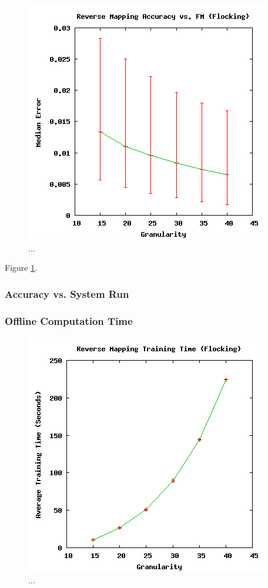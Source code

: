 \begin{figure}[ht]
\centering
\includegraphics[scale=.5]{images/results_flocking/rmacc.png}
\caption{...}
\label{fig:flockrmacc}
\end{figure}

Figure \ref{fig:flockrmacc}.

  \subsubsection{Accuracy vs. System Run}

  \subsubsection{Offline Computation Time}

\begin{figure}[ht]
\centering
\includegraphics[scale=.5]{images/results_flocking/rmtraining.png}
\caption{...}
\label{fig:flockrmtraining}
\end{figure}

